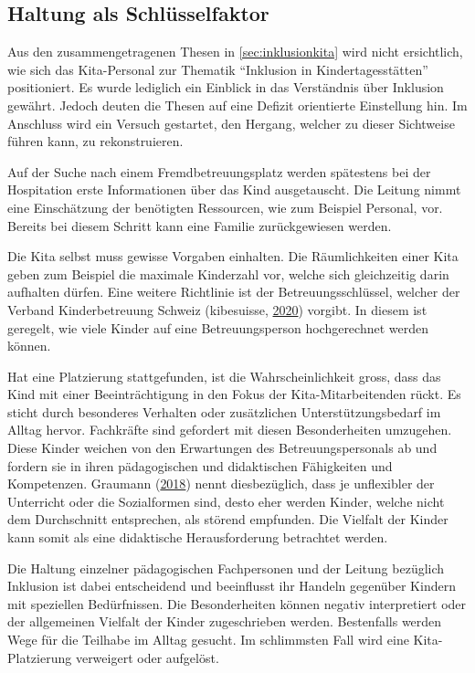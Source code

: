 \documentclass[
  ngerman,
  11pt,
  paper=a4,
  twoside,
  titlepage=true,
  openright,
  abstract=on,
  toc=listofnumbered,
  numbers=noenddot,
  chapterprefix=true,
  headings=optiontohead,
  svgnames,
  dvipsnames]{scrreprt}
\begin{document}
\hypertarget{sec:haltungsfrage}{%
\subsection{Haltung als Schlüsselfaktor}\label{sec:haltungsfrage}}

Aus den zusammengetragenen Thesen in \cref{sec:inklusionkita} wird nicht
ersichtlich, wie sich das Kita-Personal zur Thematik “Inklusion in
Kindertagesstätten” positioniert. Es wurde lediglich ein Einblick in das
Verständnis über Inklusion gewährt. Jedoch deuten die Thesen auf eine
Defizit orientierte Einstellung hin. Im Anschluss wird ein Versuch
gestartet, den Hergang, welcher zu dieser Sichtweise führen kann, zu
rekonstruieren.

Auf der Suche nach einem Fremdbetreuungsplatz werden spätestens bei der
Hospitation erste Informationen über das Kind ausgetauscht. Die Leitung
nimmt eine Einschätzung der benötigten Ressourcen, wie zum Beispiel
Personal, vor. Bereits bei diesem Schritt kann eine Familie
zurückgewiesen werden.

Die Kita selbst muss gewisse Vorgaben einhalten. Die Räumlichkeiten
einer Kita geben zum Beispiel die maximale Kinderzahl vor, welche sich
gleichzeitig darin aufhalten dürfen. Eine weitere Richtlinie ist der
Betreuungsschlüssel, welcher der Verband Kinderbetreuung Schweiz
(kibesuisse,
\protect\hyperlink{ref-richtlinienKindertagessstuxe4tten_2020}{2020})
vorgibt. In diesem ist geregelt, wie viele Kinder auf eine
Betreuungsperson hochgerechnet werden können.

Hat eine Platzierung stattgefunden, ist die Wahrscheinlichkeit gross,
dass das Kind mit einer Beeinträchtigung in den Fokus der
Kita-Mitarbeitenden rückt. Es sticht durch besonderes Verhalten oder
zusätzlichen Unterstützungsbedarf im Alltag hervor. Fachkräfte sind
gefordert mit diesen Besonderheiten umzugehen. Diese Kinder weichen von
den Erwartungen des Betreuungspersonals ab und fordern sie in ihren
pädagogischen und didaktischen Fähigkeiten und Kompetenzen. Graumann
(\protect\hyperlink{ref-unerfullbarevision}{2018}) nennt diesbezüglich,
dass je unflexibler der Unterricht oder die Sozialformen sind, desto
eher werden Kinder, welche nicht dem Durchschnitt entsprechen, als
störend empfunden. Die Vielfalt der Kinder kann somit als eine
didaktische Herausforderung betrachtet werden.

Die Haltung einzelner pädagogischen Fachpersonen und der Leitung
bezüglich Inklusion ist dabei entscheidend und beeinflusst ihr Handeln
gegenüber Kindern mit speziellen Bedürfnissen. Die Besonderheiten können
negativ interpretiert oder der allgemeinen Vielfalt der Kinder
zugeschrieben werden. Bestenfalls werden Wege für die Teilhabe im Alltag
gesucht. Im schlimmsten Fall wird eine Kita-Platzierung verweigert oder
aufgelöst.
\end{document}
